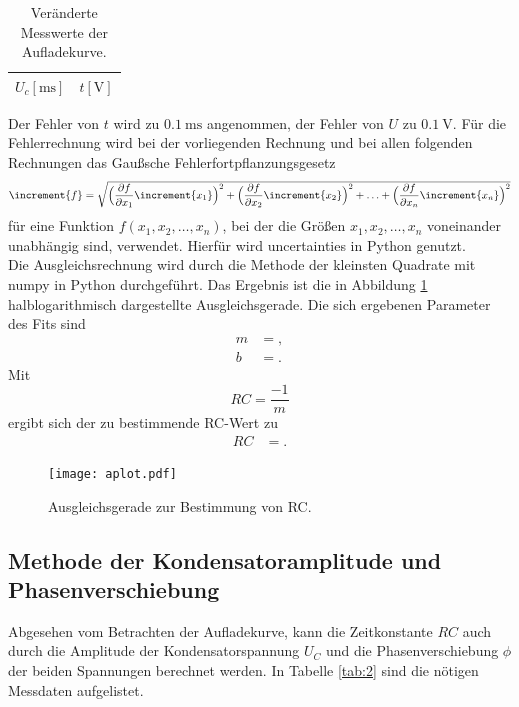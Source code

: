 \begin{table}[H]
  \centering
  \caption{Veränderte Messwerte der Aufladekurve.}
  \label{tab:werte_a_neu}
  \begin{tabular}{c c}
    \toprule
    {$U_c [\si{\milli\second}]$} & {$t [\si{\volt}]$}\\
    \midrule
    
    \bottomrule
  \end{tabular}
\end{table}

Der Fehler von $t$ wird zu $\SI{0.1}{\milli\second}$ angenommen, der Fehler von $U$ zu $\SI{0.1}{\volt}$.
Für die Fehlerrechnung wird bei der vorliegenden Rechnung und bei allen folgenden Rechnungen das Gaußsche Fehlerfortpflanzungsgesetz
\begin{equation}
\increment{f} = \sqrt{\Bigl(\frac{\partial f}{\partial x_1}\increment{x_1}\Bigr)^2 + \Bigl(\frac{\partial f}{\partial x_2}\increment{x_2}\Bigr)^2 + \dotsc + \Bigl(\frac{\partial f}{\partial x_n}\increment{x_n}\Bigr)^2}
\end{equation}
für eine Funktion $f(x_1,x_2, \dotsc ,x_n)$, bei der die Größen $x_1, x_2, \dotsc , x_n$ voneinander unabhängig sind, verwendet.
Hierfür wird uncertainties in Python genutzt.\\
Die Ausgleichsrechnung wird durch die Methode der kleinsten Quadrate mit numpy in Python durchgeführt.
Das Ergebnis ist die in Abbildung \ref{fig:plot_a} halblogarithmisch dargestellte Ausgleichsgerade.
Die sich ergebenen Parameter des Fits sind
\begin{align*}
  m &= , \\
  b &= .
\end{align*}
Mit
\begin{equation}
  RC = \frac{-1}{m}
\end{equation}
ergibt sich der zu bestimmende RC-Wert zu
\begin{align}
  RC &= .
\end{align}
\begin{figure}[H]
  \centering
  \texttt{[image: aplot.pdf]}
  \caption{Ausgleichsgerade zur Bestimmung von RC.}
  \label{fig:plot_a}
\end{figure}

\subsection{Methode der Kondensatoramplitude und Phasenverschiebung}
Abgesehen vom Betrachten der Aufladekurve, kann die Zeitkonstante $RC$ auch durch die Amplitude der Kondensatorspannung $U_C$ und die Phasenverschiebung $\phi$ der beiden Spannungen berechnet werden.
In Tabelle \ref{tab:2} sind die nötigen Messdaten aufgelistet.

